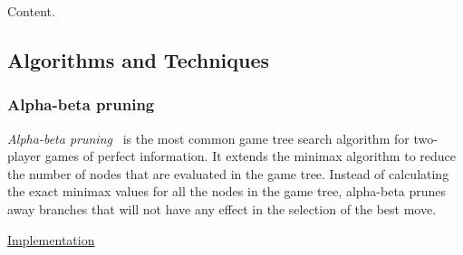\documentclass{article}
\begin{document}
Content.

\subsection{Algorithms and Techniques}

\subsubsection{Alpha-beta pruning}

\newcommand{\URLalphabeta}{https://github.com/davidrobles/mlnd-capstone-code/blob/master/capstone/player/alphabeta.py}


\emph{Alpha-beta pruning}~\citep{Knuth1975AB} is the most common game tree search algorithm for
two-player games of perfect information. It extends the minimax algorithm to reduce the number of
nodes that are evaluated in the game tree. Instead of calculating the exact minimax values for all
the nodes in the game tree, alpha-beta prunes away branches that will not have any effect in the
selection of the best move.



\href{\URLalphabeta}{Implementation}
\end{document}
